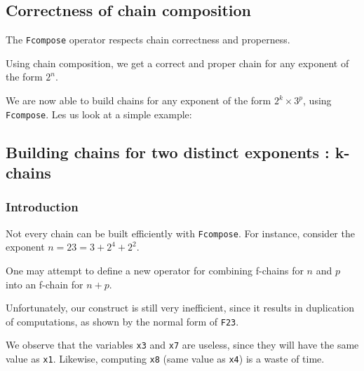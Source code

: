 
\subsection{Correctness of chain composition}

The \texttt{Fcompose} operator respects chain correctness and properness.


Using chain composition, we get a correct and proper chain for any exponent of the form $2^n$.


We are now  able to build chains for any exponent of the form 
$2^k\times 3^p$, using \texttt{Fcompose}. Les us look at a simple example:



\subsection{Building chains for two distinct exponents : k-chains  \label{Kkonts-section}}

\subsubsection{Introduction}
Not every chain can be built efficiently  with \texttt{Fcompose}.
 For instance, consider the exponent $n= 23 = 3 + 2^4 + 2^2$. 

One may attempt to define a new operator  for combining f-chains for 
$n$ and $p$ into an f-chain for $n+p$.


Unfortunately, our construct is still very inefficient, since it results in 
duplication of computations, as shown by the normal form of \texttt{F23}.

\pagebreak
{}

We observe that the variables \texttt{x3} and \texttt{x7} are 
useless, since
they will have the same value as \texttt{x1}. Likewise, computing
\texttt{x8} (same value as \texttt{x4}) is a waste of time.

